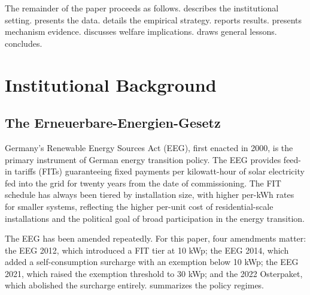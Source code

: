 \documentclass[12pt]{article}
\begin{document}
The remainder of the paper proceeds as follows.  describes the institutional setting.  presents the data.  details the empirical strategy.  reports results.  presents mechanism evidence.  discusses welfare implications.  draws general lessons.  concludes.


\section{Institutional Background}
\label{sec:background}

\subsection{The Erneuerbare-Energien-Gesetz}

Germany's Renewable Energy Sources Act (EEG), first enacted in 2000, is the primary instrument of German energy transition policy. The EEG provides feed-in tariffs (FITs) guaranteeing fixed payments per kilowatt-hour of solar electricity fed into the grid for twenty years from the date of commissioning. The FIT schedule has always been tiered by installation size, with higher per-kWh rates for smaller systems, reflecting the higher per-unit cost of residential-scale installations and the political goal of broad participation in the energy transition.

The EEG has been amended repeatedly. For this paper, four amendments matter: the EEG 2012, which introduced a FIT tier at 10 kWp; the EEG 2014, which added a self-consumption surcharge with an exemption below 10 kWp; the EEG 2021, which raised the exemption threshold to 30 kWp; and the 2022 Osterpaket, which abolished the surcharge entirely.  summarizes the policy regimes.
\end{document}
